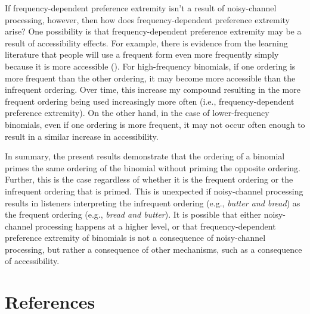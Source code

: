 \documentclass[
  12pt,
]{scrartcl}
\begin{document}
If frequency-dependent preference extremity isn't a result of
noisy-channel processing, however, then how does frequency-dependent
preference extremity arise? One possibility is that frequency-dependent
preference extremity may be a result of accessibility effects. For
example, there is evidence from the learning literature that people will
use a frequent form even more frequently simply because it is more
accessible (). For high-frequency binomials, if one ordering is
more frequent than the other ordering, it may become more accessible
than the infrequent ordering. Over time, this increase my compound
resulting in the more frequent ordering being used increasingly more
often (i.e., frequency-dependent preference extremity). On the other
hand, in the case of lower-frequency binomials, even if one ordering is
more frequent, it may not occur often enough to result in a similar
increase in accessibility.

In summary, the present results demonstrate that the ordering of a
binomial primes the same ordering of the binomial without priming the
opposite ordering. Further, this is the case regardless of whether it is
the frequent ordering or the infrequent ordering that is primed. This is
unexpected if noisy-channel processing results in listeners interpreting
the infrequent ordering (e.g., \emph{butter and bread}) as the frequent
ordering (e.g., \emph{bread and butter}). It is possible that either
noisy-channel processing happens at a higher level, or that
frequency-dependent preference extremity of binomials is not a
consequence of noisy-channel processing, but rather a consequence of
other mechanisms, such as a consequence of accessibility.

\clearpage

\section*{References}\label{references}
\end{document}
